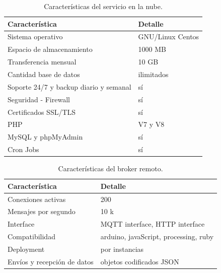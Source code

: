 \begin{table}[h]
	\centering
	\caption[Características del servicio en la nube]{Características del servicio en la nube.}
	\begin{tabular}{p{7cm} p{5cm} }    
		\toprule
		\textbf{Característica} 	 & \textbf{Detalle}  \\
		\midrule
		Sistema operativo  & GNU/Linux Centos\\		
		Espacio de almacenamiento & 1000 MB \\
		Transferencia mensual  & 10 GB\\				
		Cantidad base de datos 	  & ilimitados\\
		Soporte 24/7 y backup diario y semanal	  & sí\\
		Seguridad - Firewall	  & sí\\
		Certificados SSL/TLS	  & sí\\
		PHP	  & V7 y V8\\
		MySQL y	phpMyAdmin  & sí\\
		Cron Jobs	  & sí\\
		\bottomrule
		\hline
	\end{tabular}
	\label{tab:serverweb}
\end{table}


\begin{table}[h]
	\centering
	\caption[Características del broker remoto]{Características del broker remoto.}
	\begin{tabular}{p{5cm} p{7cm} }    
		\toprule
		\textbf{Característica} 	 & \textbf{Detalle}  \\
		\midrule
		Conexiones activas  & 200\\		
		Mensajes por segundo & 10 k \\
		Interface  & MQTT interface, HTTP interface\\		
		Compatibilidad & arduino, javaScript, processing, ruby \\		
		Deployment 	  & por instancias\\
		Envíos y recepción de datos & objetos codificados JSON\\
		
		\bottomrule
		\hline
	\end{tabular}
	\label{tab:brokerremoto}
\end{table}





